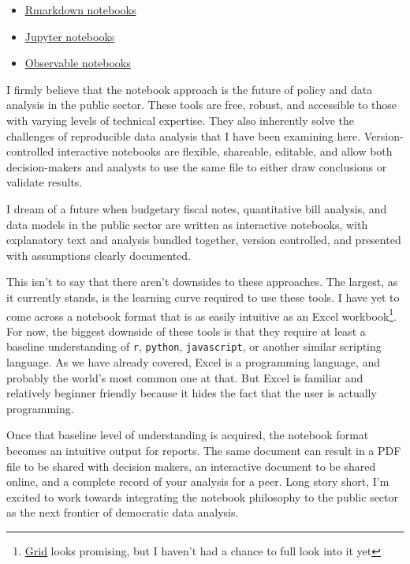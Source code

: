 \documentclass[]{book}
\providecommand{\tightlist}{%
  \setlength{\itemsep}{0pt}\setlength{\parskip}{0pt}}
\begin{document}
\begin{itemize}
\tightlist
\item
  \href{https://rmarkdown.rstudio.com}{Rmarkdown notebooks}
\item
  \href{https://jupyter-notebook.readthedocs.io/en/stable/}{Jupyter notebooks}
\item
  \href{https://observablehq.com}{Observable notebooks}
\end{itemize}

I firmly believe that the notebook approach is the future of policy and data analysis in the public sector. These tools are free, robust, and accessible to those with varying levels of technical expertise. They also inherently solve the challenges of reproducible data analysis that I have been examining here. Version-controlled interactive notebooks are flexible, shareable, editable, and allow both decision-makers and analysts to use the same file to either draw conclusions or validate results.

I dream of a future when budgetary fiscal notes, quantitative bill analysis, and data models in the public sector are written as interactive notebooks, with explanatory text and analysis bundled together, version controlled, and presented with assumptions clearly documented.

This isn't to say that there aren't downsides to these approaches. The largest, as it currently stands, is the learning curve required to use these tools. I have yet to come across a notebook format that is as easily intuitive as an Excel workbook\footnote{\href{https://beta.grid.is/@grid/what-is-grid-yBYeOyirSSKBlknj25F98A}{Grid} looks promising, but I haven't had a chance to full look into it yet}. For now, the biggest downside of these tools is that they require at least a baseline understanding of \texttt{r}, \texttt{python}, \texttt{javascript}, or another similar scripting language. As we have already covered, Excel is a programming language, and probably the world's most common one at that. But Excel is familiar and relatively beginner friendly because it hides the fact that the user is actually programming.

Once that baseline level of understanding is acquired, the notebook format becomes an intuitive output for reports. The same document can result in a PDF file to be shared with decision makers, an interactive document to be shared online, and a complete record of your analysis for a peer. Long story short, I'm excited to work towards integrating the notebook philosophy to the public sector as the next frontier of democratic data analysis.
\end{document}

